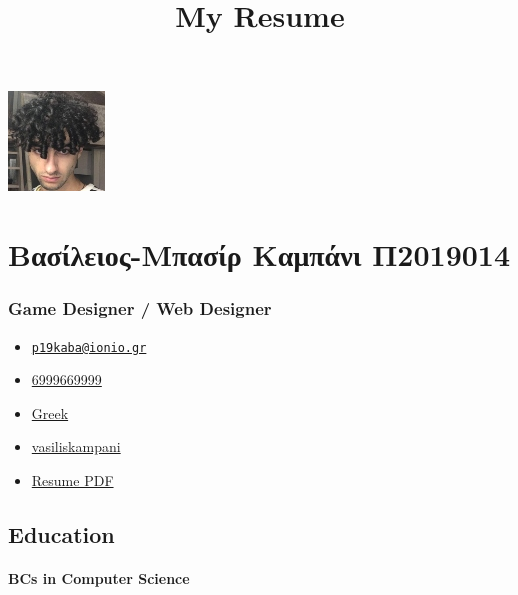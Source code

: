 \documentclass[english,]{article}
\title{My Resume}
\date{}
\providecommand{\tightlist}{%
  \setlength{\itemsep}{0pt}\setlength{\parskip}{0pt}}
\let\oldparagraph\paragraph
\renewcommand{\paragraph}[1]{\oldparagraph{#1}\mbox{}}
\begin{document}
\maketitle

\includegraphics{vasiliskampani.jpg}

\hypertarget{ux3b2ux3b1ux3c3ux3afux3bbux3b5ux3b9ux3bfux3c2-ux3bcux3c0ux3b1ux3c3ux3afux3c1-ux3baux3b1ux3bcux3c0ux3acux3bdux3b9-ux3c02019014}{%
\section{Βασίλειος-Μπασίρ Καμπάνι
Π2019014}\label{ux3b2ux3b1ux3c3ux3afux3bbux3b5ux3b9ux3bfux3c2-ux3bcux3c0ux3b1ux3c3ux3afux3c1-ux3baux3b1ux3bcux3c0ux3acux3bdux3b9-ux3c02019014}}

\hypertarget{game-designer-web-designer}{%
\subsubsection{Game Designer / Web
Designer}\label{game-designer-web-designer}}

\begin{itemize}
\tightlist
\item
  \emph{} \href{mailto:p19kaba@ionio.gr}{\nolinkurl{p19kaba@ionio.gr}}
\item
  \emph{} \href{tel:6999669999}{6999669999}
\item
  \emph{} \href{}{Greek}
\item
  \emph{} \href{http://github.com/vasiliskampani}{vasiliskampani}
\item
  \emph{} \href{http://www.africau.edu/images/default/sample.pdf}{Resume
  PDF}
\end{itemize}

\hypertarget{education}{%
\subsection{Education}\label{education}}

\hypertarget{bcs-in-computer-science}{%
\paragraph{BCs in Computer Science}\label{bcs-in-computer-science}}
\end{document}
